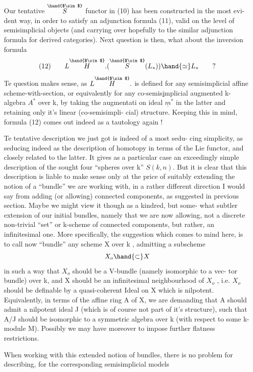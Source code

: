 
Our tentative $\overset{\hand{$\sim$}}{S}$ functor in (10) has been constructed in the most evi-%
dent way,  in order to satisfy an adjunction formula (11),  valid on
the level of semisimplicial objects  (and carrying over\hand{,} hopefully\hand{,}
to the similar adjunction formula for  derived categories).
Next question is then,  what about the inversion formula
\[
(12)\qquad L\overset{\hand{$\sim$}}{H}.(\overset{\hand{$\sim$}}{S}(L_*))\hand{\simeq} L_* \qquad ?
\]
Te question makes sense,  as  $L\overset{\hand{$\sim$}}{H}.$  is  defined for any
semisimplicial affine scheme-with-section, or equivalently for any
co-semis\uline{i}mplicial augmented k-algebra $A^*$ over k,  by taking the augmentati%
on ideal  $\underline{m}^*$  in the latter and retaining only it's linear (co-semisimpli-%
cial) structure.  Keeping this in mind,  formula (12) comes out indeed as
a tautology again !

Te  tentative description we just got is indeed of a most sedu-%
cing simplicity,  as seducing indeed as the description of homotopy in
terms of the Lie functor,  and closely related to the latter.  It gives
as a particular case an exceedingly simple description of the sought
four ``spheres over k''  $S(k,n)$.  But it is clear that this description is
liable to make sense only at the price of suitably extending the notion
of a ``bundle'' we are working with,  in a rather different direction I
would say from adding (or allowing) connected components, as suggested in
previous section.  Maybe we might view it though as a kindred,  but some-%
what subtler extension of our initial bundles,  namely that we are
now allowing,  not a discrete non-trivial ``set'' or k-scheme of connected
components,  but rather,  an infinitesimal one.  More specifically,
the suggestion which comes to mind here,  is to call now ``bundle''  any
scheme  X over  k ,  admitting a subscheme
\[
X_o \hand{\subset} X
\]
in such a way that $X_o$ should be a V-bundle (namely isomorphic to a vec-%
tor bundle) over k,  and X should be an infinitesimal neighbourhood of
$X_o$ ,  i.e. $X_o$ should be definable by a quasi-coherent Ideal  on X which
is nilpotent.  Equivalently,  in terms of the affine ring A of X,  we
are demanding that A should admit a nilpotent ideal J (which is of course
not part of it's structure),  such that A/J should be isomorphic to a
symmetric algebra over k (with respect to some k-module M).  Possibly
we may have moreover to impose further flatness restrictions.

When working with this extended notion of bundles,  there is no
problem for describing,  for the corresponding semisimplicial models


